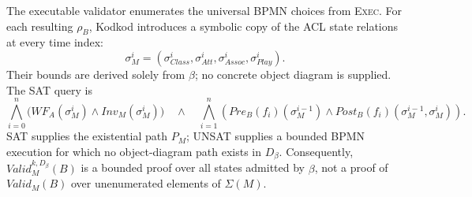 \documentclass[11pt,a4paper]{article}
\begin{document}
The executable validator enumerates the universal BPMN choices from
\textsc{Exec}. For each resulting $\rho_B$, Kodkod introduces a symbolic copy
of the ACL state relations at every time index:
\[
\sigma_M^i
=
(\sigma_{Class}^i,\sigma_{Att}^i,\sigma_{Assoc}^i,\sigma_{Play}^i).
\]
Their bounds are derived solely from $\beta$; no concrete object diagram is
supplied. The SAT query is
\[
\bigwedge_{i=0}^{n}
\bigl(WF_A(\sigma_M^i)\land Inv_M(\sigma_M^i)\bigr)
\quad\land\quad
\bigwedge_{i=1}^{n}
\left(
\mathit{Pre}_B(f_i)(\sigma_M^{i-1})
\land
\mathit{Post}_B(f_i)(\sigma_M^{i-1},\sigma_M^i)
\right).
\]
SAT supplies the existential path $P_M$; UNSAT supplies a bounded BPMN
execution for which no object-diagram path exists in $D_\beta$. Consequently,
$Valid_M^{k,D_\beta}(B)$ is a bounded proof over all states admitted by
$\beta$, not a proof of
$Valid_M(B)$ over unenumerated elements of $\Sigma(M)$.
\end{document}
